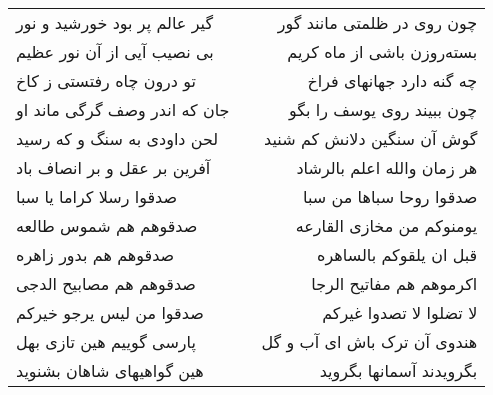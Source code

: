 \begin{center}
\begin{longtable}{l p{0.5cm} r}
گیر عالم پر بود خورشید و نور
&&
چون روی در ظلمتی مانند گور
\\
بی نصیب آیی از آن نور عظیم
&&
بسته‌روزن باشی از ماه کریم
\\
تو درون چاه رفتستی ز کاخ
&&
چه گنه دارد جهانهای فراخ
\\
جان که اندر وصف گرگی ماند او
&&
چون ببیند روی یوسف را بگو
\\
لحن داودی به سنگ و که رسید
&&
گوش آن سنگین دلانش کم شنید
\\
آفرین بر عقل و بر انصاف باد
&&
هر زمان والله اعلم بالرشاد
\\
صدقوا رسلا کراما یا سبا
&&
صدقوا روحا سباها من سبا
\\
صدقوهم هم شموس طالعه
&&
یومنوکم من مخازی القارعه
\\
صدقوهم هم بدور زاهره
&&
قبل ان یلقوکم بالساهره
\\
صدقوهم هم مصابیح الدجی
&&
اکرموهم هم مفاتیح الرجا
\\
صدقوا من لیس یرجو خیرکم
&&
لا تضلوا لا تصدوا غیرکم
\\
پارسی گوییم هین تازی بهل
&&
هندوی آن ترک باش ای آب و گل
\\
هین گواهیهای شاهان بشنوید
&&
بگرویدند آسمانها بگروید
\\
\end{longtable}
\end{center}
